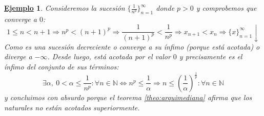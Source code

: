 \documentclass[10pt,a4paper,openright]{book}
\theoremstyle{break}
\newtheorem{ej}{\underline{Ejemplo}}[chapter]
\begin{document}
\begin{ej}
Consideremos la sucesión $\{\frac{1}{n^p}\}_{n=1}^\infty$ donde $p>0$ y comprobemos que converge a $0$:
\[
1\leq n<n+1\Rightarrow n^p < (n+1)^p \Rightarrow \frac{1}{(n+1)^p} < \frac{1}{n^p} \Rightarrow x_{n+1} < x_n \Rightarrow \{x\}_{n=1}^\infty \downarrow
\]
Como es una sucesión decreciente o converge a su ínfimo (porque está acotada) o diverge a $-\infty$. Desde luego, está acotada por el valor $0$ y precisamente es el ínfimo del conjunto de sus términos:
\[
\exists \alpha, \ 0 < \alpha \leq \frac{1}{n^p}: \forall n\in \mathbb N \Leftrightarrow n^p\leq \frac{1}{\alpha}\Rightarrow n\leq \left(\frac{1}{\alpha}\right)^{\frac{1}{p}}: \forall n \in \mathbb N
\]
y concluimos con absurdo porque el teorema \ref{theo:arquimediana} afirma que los naturales no están acotados superiormente.
\end{ej}
\end{document}
